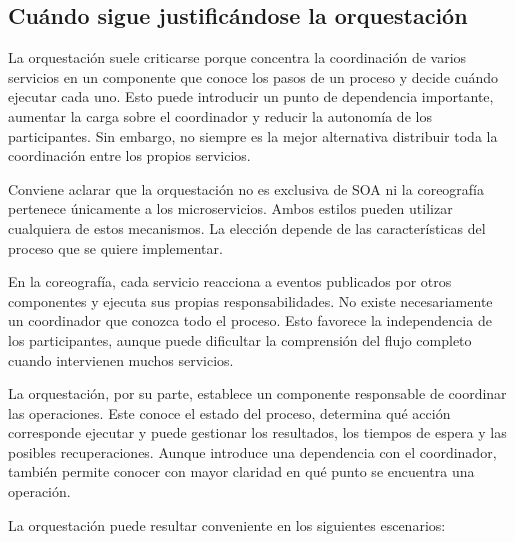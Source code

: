 \subsection{Cuándo sigue justificándose la orquestación}

La orquestación suele criticarse porque concentra la coordinación de varios servicios en un componente que conoce los pasos de un proceso y decide cuándo ejecutar cada uno. Esto puede introducir un punto de dependencia importante, aumentar la carga sobre el coordinador y reducir la autonomía de los participantes. Sin embargo, no siempre es la mejor alternativa distribuir toda la coordinación entre los propios servicios.

Conviene aclarar que la orquestación no es exclusiva de SOA ni la coreografía pertenece únicamente a los microservicios. Ambos estilos pueden utilizar cualquiera de estos mecanismos. La elección depende de las características del proceso que se quiere implementar.

En la coreografía, cada servicio reacciona a eventos publicados por otros componentes y ejecuta sus propias responsabilidades. No existe necesariamente un coordinador que conozca todo el proceso. Esto favorece la independencia de los participantes, aunque puede dificultar la comprensión del flujo completo cuando intervienen muchos servicios.

La orquestación, por su parte, establece un componente responsable de coordinar las operaciones. Este conoce el estado del proceso, determina qué acción corresponde ejecutar y puede gestionar los resultados, los tiempos de espera y las posibles recuperaciones. Aunque introduce una dependencia con el coordinador, también permite conocer con mayor claridad en qué punto se encuentra una operación.

La orquestación puede resultar conveniente en los siguientes escenarios:

